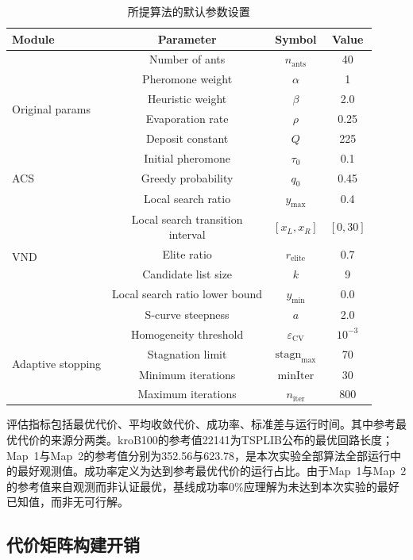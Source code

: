 \documentclass[lettersize,journal]{IEEEtran}
\begin{document}
\begin{table}[htbp]
\caption{所提算法的默认参数设置}
\label{tab:params}
\centering
\scriptsize
\begin{tabular}{lccc}
\toprule
Module & Parameter & Symbol & Value \\
\midrule
\multirow{6}{*}{Original params} 
& Number of ants & $n_{\mathrm{ants}}$ & 40 \\
& Pheromone weight & $\alpha$ & 1 \\
& Heuristic weight & $\beta$ & 2.0 \\
& Evaporation rate & $\rho$ & 0.25 \\
& Deposit constant & $Q$ & 225 \\
& Initial pheromone & $\tau_0$ & 0.1 \\
\midrule
\multirow{1}{*}{ACS} 
& Greedy probability & $q_0$ & 0.45 \\
\midrule
\multirow{6}{*}{VND} 
& Local search ratio & $y_{\max}$ & 0.4 \\
& \makecell{Local search transition\\interval} & $[x_L, x_R]$ & $[0, 30]$ \\
& Elite ratio & $r_{\mathrm{elite}}$ & 0.7 \\
& Candidate list size & $k$ & 9 \\
& Local search ratio lower bound & $y_{\min}$ & 0.0 \\
& S-curve steepness & $a$ & 2.0 \\
\midrule
\multirow{4}{*}{Adaptive stopping} 
& Homogeneity threshold & $\varepsilon_{\mathrm{CV}}$ & $10^{-3}$ \\
& Stagnation limit & $\mathrm{stagn}_{\max}$ & 70 \\
& Minimum iterations & $\mathrm{minIter}$ & 30 \\
& Maximum iterations & $n_{\mathrm{iter}}$ & 800 \\
\bottomrule
\end{tabular}
\end{table}

评估指标包括最优代价、平均收敛代价、成功率、标准差与运行时间。其中参考最优代价的来源分两类。kroB100的参考值22141为TSPLIB公布的最优回路长度；Map~1与Map~2的参考值分别为352.56与623.78，是本次实验全部算法全部运行中的最好观测值。成功率定义为达到参考最优代价的运行占比。由于Map~1与Map~2的参考值来自观测而非认证最优，基线成功率0\%应理解为未达到本次实验的最好已知值，而非无可行解。
\subsection{代价矩阵构建开销}
\label{subsec:exp_matrix}
\end{document}
